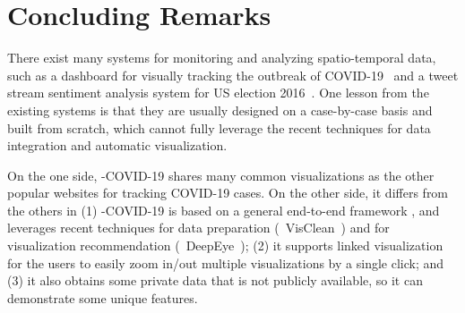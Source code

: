 
\section{Concluding Remarks}
\label{conclusion}

There exist many systems for monitoring and analyzing spatio-temporal data, such as a dashboard for visually tracking the outbreak of COVID-19~\cite{dong2020interactive} and a tweet stream sentiment analysis system for US election 2016~\cite{DBLP:conf/kdd/PaulLTYF17}. 
One lesson from the existing systems is  that they are usually designed on a case-by-case basis and built from scratch, which cannot fully leverage the recent techniques for data integration and automatic visualization.

On the one side, \sys-COVID-19 shares many common visualizations as the other popular websites for tracking COVID-19 cases.
On the other side, it differs from the others in 
(1) \sys-COVID-19 is based on a general end-to-end framework \sys, and leverages recent techniques for data preparation (\eg~{\sc VisClean}~\cite{visclean-icde}) and for visualization recommendation (\eg~{\sc DeepEye}~\cite{deepeyeicde});
%
(2) it supports linked visualization for the users to easily zoom in/out multiple visualizations by a single click; and
%
(3) it also obtains some private data that is not publicly available, so it can demonstrate some unique features.
%

